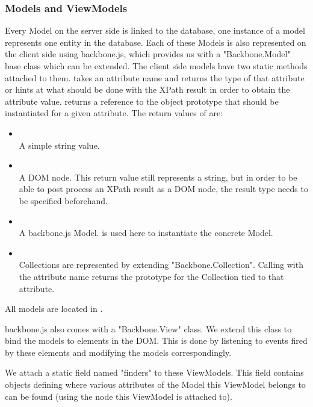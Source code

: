\subsubsection{Models and ViewModels}
Every Model on the server side is linked to the database, one instance of a
model represents one entity in the database. Each of these Models is also
represented on the client side using backbone.js, which provides us with
a "Backbone.Model" base class which can be extended.
The client side models have two static methods attached to them.
 takes an attribute name and returns the type of that
attribute or hints at what should be done with the XPath result in order to
obtain the attribute value.
 returns a reference to the object prototype that should
be instantiated for a given attribute.
The return values of  are:
\begin{itemize}
	\item \emph{}\\
	A simple string value.
	\item \emph{}\\
	A DOM node. This return value still represents a string, but in order to be
	able to post process an XPath result as a DOM node, the result type needs to
	be specified beforehand. 
	\item \emph{}\\
	A backbone.js Model.  is used here to instantiate the
	concrete Model.
	\item \emph{}\\
	Collections are represented by extending "Backbone.Collection". Calling
	 with the attribute name returns the prototype for the
	Collection tied to that attribute.
\end{itemize}
All models are located in .

backbone.js also comes with a "Backbone.View" class. We extend this class to
bind the models to elements in the DOM. This is done by listening to events
fired by these elements and modifying the models correspondingly.

We attach a static field named "finders" to these ViewModels. This field
contains objects defining where various attributes of the Model this ViewModel
belongs to can be found (using the node this ViewModel is attached to).

